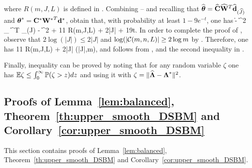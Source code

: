 \ee
where $R(m,J,L)$ is defined in .
% 
Combining -- and recalling that $\hbte = \hbC \hbW^T \hbd_{(\hJ)}$ and $\btes = \bCs \bWs^T \bds$, 
obtain  that, with probability at least $1 - 9 e^{-t}$, one has
\be \label{in_eq}
\|\hbte - \btes\|^2 \leq   \min_{} 
  \| \bC \bW^T \bd_{(J)} - \btes \|^2  +   11  R(m,J,L)  + 2|J|  \rfi + 19t. 
\ee 
 In order to complete the proof of , observe that 
$2 \log(|J|) \leq 2|J|$ and $\log(|{\mathcal{C}}(m,n,L)|\geq  2 \log m$ by .
Therefore, one has
\be \label{pen_cond}
 11  R(m,J,L)  + 2|J|  \Pen(|J|,m),
 \ee
and  follows from ,  and the second inequality in .
 
Finally, inequality  can  be proved by noting that for any random variable $\zeta$ one has
${\mathbb E} \zeta \leq \int_0^\infty {\mathbb P}(\zeta >z) dz$ and using it with $\zeta = \|\hbLam - \bLams\|^2$.
 



\subsection{ Proofs of Lemma~\ref{lem:balanced},   Theorem~\ref{th:upper_smooth_DSBM} and Corollary~\ref{cor:upper_smooth_DSBM}}
This section contains proofs of Lemma~\ref{lem:balanced},   Theorem~\ref{th:upper_smooth_DSBM} 
and Corollary~\ref{cor:upper_smooth_DSBM}.
\\





